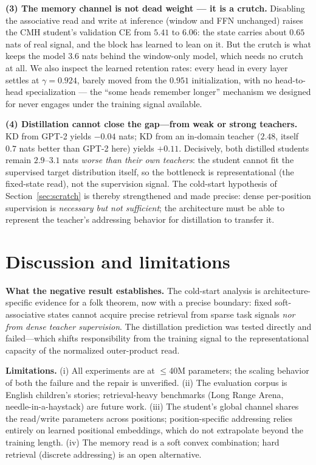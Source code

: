 \documentclass[11pt]{article}
\newcommand{\cmh}{CMH}
\begin{document}
\textbf{(3) The memory channel is not dead weight --- it is a crutch.} Disabling the
associative read and write at inference (window and FFN unchanged) raises the \cmh{}
student's validation CE from $5.41$ to $6.06$: the state carries about $0.65$ nats of
real signal, and the block has learned to lean on it. But the crutch is what keeps the
model $3.6$ nats behind the window-only model, which needs no crutch at all. We also
inspect the learned retention rates: every head in every layer settles at
$\gamma = 0.924$, barely moved from the $0.951$ initialization, with no head-to-head
specialization --- the ``some heads remember longer'' mechanism we designed for never
engages under the training signal available.

\textbf{(4) Distillation cannot close the gap---from weak or strong teachers.} KD from
GPT-2 yields $-0.04$ nats; KD from an in-domain teacher ($2.48$, itself $0.7$ nats better
than GPT-2 here) yields $+0.11$. Decisively, both distilled students remain
$2.9$--$3.1$ nats \emph{worse than their own teachers}: the student cannot fit the
supervised target distribution itself, so the bottleneck is representational
(the fixed-state read), not the supervision signal. The cold-start hypothesis of
Section~\ref{sec:scratch} is thereby strengthened and made precise: dense per-position
supervision is \emph{necessary but not sufficient}; the architecture must be able to
represent the teacher's addressing behavior for distillation to transfer it.

\section{Discussion and limitations}\label{sec:discussion}

\textbf{What the negative result establishes.} The cold-start analysis is
architecture-specific evidence for a folk theorem, now with a precise boundary: fixed
soft-associative states cannot acquire precise retrieval from sparse task signals
\emph{nor from dense teacher supervision}. The distillation prediction was tested
directly and failed---which shifts responsibility from the training signal to the
representational capacity of the normalized outer-product read.

\textbf{Limitations.} (i) All experiments are at $\le$40M parameters; the scaling
behavior of both the failure and the repair is unverified. (ii) The evaluation corpus is
English children's stories; retrieval-heavy benchmarks (Long Range Arena,
needle-in-a-haystack) are future work. (iii) The student's global channel shares the
read/write parameters across positions; position-specific addressing relies entirely on
learned positional embeddings, which do not extrapolate beyond the training length.
(iv) The memory read is a soft convex combination; hard retrieval (discrete addressing)
is an open alternative.
\end{document}
